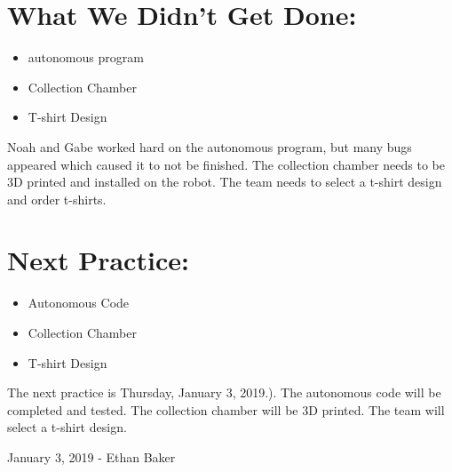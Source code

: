 \documentclass[12pt]{article}
\begin{document}
\section{What We Didn't Get Done:} %
\begin{itemize}
	 \item autonomous program

	\item Collection Chamber

	\item T-shirt Design
	
  \end{itemize}



            Noah and Gabe worked hard on the autonomous program, but many bugs appeared which caused it to not be finished.  The collection chamber needs to be 3D printed and installed on the robot. The team needs to select a t-shirt design and order t-shirts.
\section{Next Practice:}
\begin{itemize}
	 \item Autonomous Code

	\item Collection Chamber

	\item T-shirt Design                      
\end{itemize}

The next practice is Thursday, January 3, 2019.). The autonomous code will be completed and tested. The collection chamber will be 3D printed. The team will select a t-shirt design.

\newpage
\setcounter{section}{0}

January 3, 2019 - Ethan Baker
\end{document}
